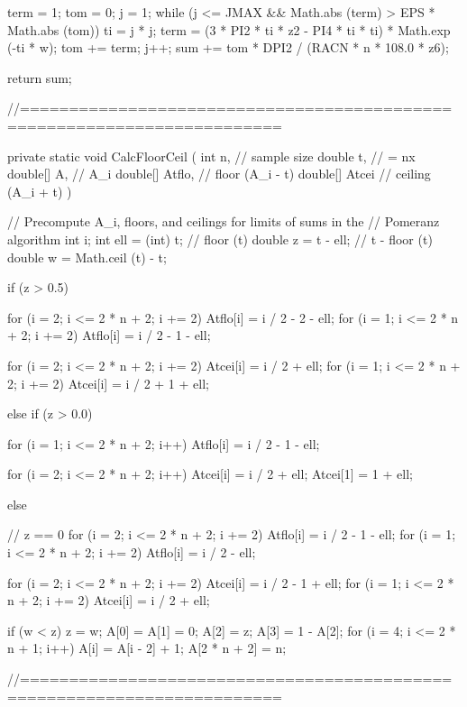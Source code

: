 \begin{code}
\begin{hide}
{      term = 1;
      tom = 0;
      j = 1;
      while (j <= JMAX && Math.abs (term) > EPS * Math.abs (tom)) {
         ti = j * j;
         term = (3 * PI2 * ti * z2 - PI4 * ti * ti) * Math.exp (-ti * w);
         tom += term;
         j++;
      }
      sum += tom * DPI2 / (RACN * n * 108.0 * z6);

      return sum;
   }


//========================================================================

   private static void CalcFloorCeil (
      int n,                       // sample size
      double t,                    // = nx
      double[] A,                  // A_i
      double[] Atflo,              // floor (A_i - t)
      double[] Atcei               // ceiling (A_i + t)
   )
   {
      // Precompute A_i, floors, and ceilings for limits of sums in the
      // Pomeranz algorithm
      int i;
      int ell = (int) t;           // floor (t)
      double z = t - ell;          // t - floor (t)
      double w = Math.ceil (t) - t;

      if (z > 0.5) {
         for (i = 2; i <= 2 * n + 2; i += 2)
            Atflo[i] = i / 2 - 2 - ell;
         for (i = 1; i <= 2 * n + 2; i += 2)
            Atflo[i] = i / 2 - 1 - ell;

         for (i = 2; i <= 2 * n + 2; i += 2)
            Atcei[i] = i / 2 + ell;
         for (i = 1; i <= 2 * n + 2; i += 2)
            Atcei[i] = i / 2 + 1 + ell;

      } else if (z > 0.0) {
         for (i = 1; i <= 2 * n + 2; i++)
            Atflo[i] = i / 2 - 1 - ell;

         for (i = 2; i <= 2 * n + 2; i++)
            Atcei[i] = i / 2 + ell;
         Atcei[1] = 1 + ell;

      } else {                       // z == 0
         for (i = 2; i <= 2 * n + 2; i += 2)
            Atflo[i] = i / 2 - 1 - ell;
         for (i = 1; i <= 2 * n + 2; i += 2)
            Atflo[i] = i / 2 - ell;

         for (i = 2; i <= 2 * n + 2; i += 2)
            Atcei[i] = i / 2 - 1 + ell;
         for (i = 1; i <= 2 * n + 2; i += 2)
            Atcei[i] = i / 2 + ell;
      }

      if (w < z)
         z = w;
      A[0] = A[1] = 0;
      A[2] = z;
      A[3] = 1 - A[2];
      for (i = 4; i <= 2 * n + 1; i++)
         A[i] = A[i - 2] + 1;
      A[2 * n + 2] = n;
   }


   //========================================================================


\end{hide}
\end{code}
